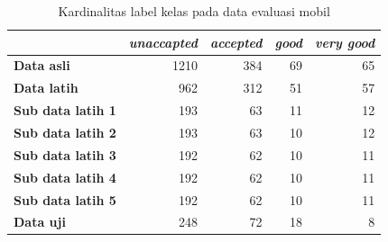 \begin{table}[htbp!]
  \centering
  \caption{Kardinalitas label kelas pada data evaluasi mobil}
    \begin{tabular}{lrrrr}
    \toprule
          & \multicolumn{1}{c}{\textit{\textbf{unaccapted}}} & \multicolumn{1}{c}{ \textit{\textbf{accepted}}} & \multicolumn{1}{c}{ \textit{\textbf{good}}} & \multicolumn{1}{c}{ \textit{\textbf{very good}}} \\
    \midrule
    \textbf{Data asli} & 1210  & 384   & 69    & 65 \\
    \textbf{Data latih} & 962   & 312   & 51    & 57 \\
    \textbf{Sub data latih 1} & 193   & 63    & 11    & 12 \\
    \textbf{Sub data latih 2} & 193   & 63    & 10    & 12 \\
    \textbf{Sub data latih 3} & 192   & 62    & 10    & 11 \\
    \textbf{Sub data latih 4} & 192   & 62    & 10    & 11 \\
    \textbf{Sub data latih 5} & 192   & 62    & 10    & 11 \\
    \textbf{Data uji} & 248   & 72    & 18    & 8 \\
    \bottomrule
    \end{tabular}%
  \label{tab: label kelas mobil}%
\end{table}%

